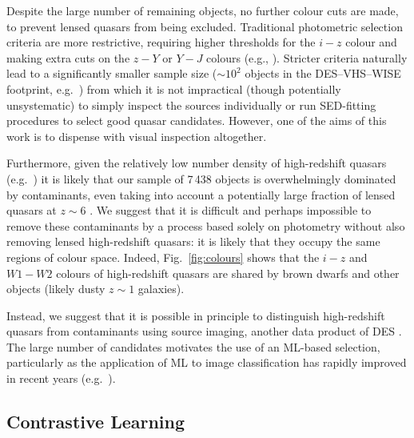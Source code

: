\documentclass[fleqn,usenatbib]{mnras}
\begin{document}
Despite the large number of remaining objects, no further colour cuts are made, to prevent lensed quasars from being excluded.
Traditional photometric selection criteria are more restrictive, requiring higher thresholds for the $\mathit{i}-\mathit{z}$ colour and making extra cuts on the $\mathit{z}-\mathit{Y}$ or $\mathit{Y}-\mathit{J}$ colours (e.g., \citealt{banados14, Banados2016}).
Stricter criteria naturally lead to a significantly smaller sample size ($\sim 10^2$ objects in the DES--VHS--WISE footprint, e.g.\ \citealt{reed15, reed17}) from which it is not impractical (though potentially unsystematic) to simply inspect the sources individually or run SED-fitting procedures to select good quasar candidates.
However, one of the aims of this work is to dispense with visual inspection altogether.

Furthermore, given the relatively low number density of high-redshift quasars (e.g.\ \citealt{schindler23}) it is likely that our sample of 7\,438 objects is overwhelmingly dominated by contaminants, even taking into account a potentially large fraction of lensed quasars at $z\sim 6$ \citep{pacucci19, minghao22}.
We suggest that it is difficult and perhaps impossible to remove these contaminants by a process based solely on photometry without also removing lensed high-redshift quasars: it is likely that they occupy the same regions of colour space.
Indeed, Fig.~\ref{fig:colours} shows that the $\mathit{i}-\mathit{z}$ and $\mathit{W1}-\mathit{W2}$ colours of high-redshift quasars are shared by brown dwarfs and other objects (likely dusty $z\sim1$ galaxies).

Instead, we suggest that it is possible in principle to distinguish high-redshift quasars from contaminants using source imaging, another data product of DES \citep{des}.
The large number of candidates motivates the use of an ML-based selection, particularly as the application of ML to image classification has rapidly improved in recent years (e.g.\ \citealt{lecun15, pak17}).


\subsection{Contrastive Learning} \label{contrastive}
\end{document}
